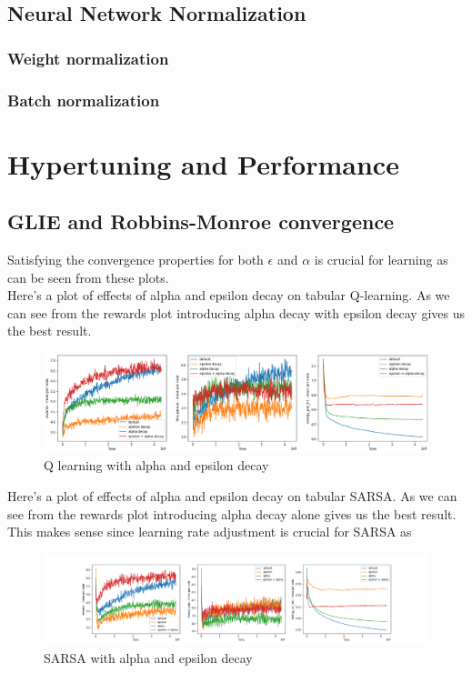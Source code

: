 \section{Neural Network Normalization}
\subsection{Weight normalization}



\subsection{Batch normalization}

\chapter{Hypertuning and Performance}

\section{GLIE and Robbins-Monroe convergence}
Satisfying the convergence properties for both $\epsilon$
and $\alpha$ is crucial for learning as can be seen from
these plots. \\


Here's a plot of effects of alpha and epsilon decay on tabular Q-learning. As we can see from the rewards plot introducing alpha decay with epsilon decay gives us the best result.
\begin{figure}[H]
\centering
\hspace*{-1.1cm}  
\includegraphics[scale=0.40]{plots/decays/tabular_q_learning_decay_SMALL.png}
  \caption{Q learning with alpha and epsilon decay}
\end{figure}

Here's a plot of effects of alpha and epsilon decay on tabular SARSA. As we can see from the rewards plot introducing alpha decay alone gives us the best result. This makes sense since learning rate adjustment is crucial for SARSA as 
\begin{figure}[H]
\centering
\hspace*{-3.3cm}  
\includegraphics[scale=0.40]{plots/decays/decay_tabular_sarsa_SMALL.png}
  \caption{SARSA with alpha and epsilon decay}
\end{figure}

